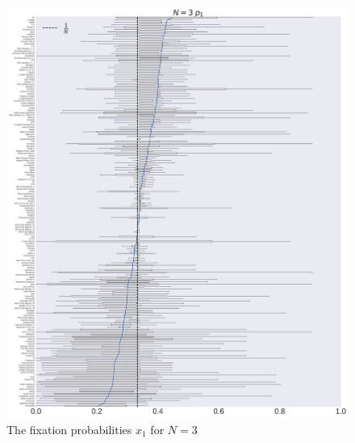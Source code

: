 \documentclass[10pt,letterpaper]{article}
\begin{document}
\begin{figure}[!hbtp]
    \centering
    \includegraphics[width=\textwidth]{./boxplot_3_invade.pdf}
    \caption{The fixation probabilities \(x_1\) for \(N=3\)}
    \label{invasion-3}
\end{figure}
\end{document}
